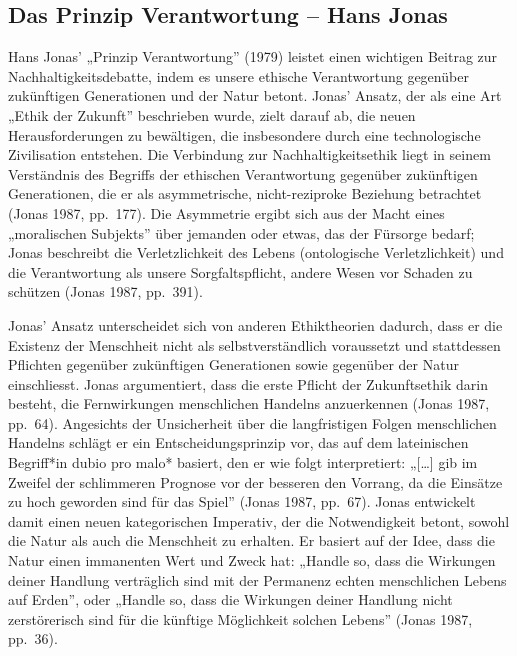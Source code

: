 \documentclass[
  nswissgerman,
  a4paper,
  openany]{book}
\begin{document}
\subsection{Das Prinzip Verantwortung -- Hans
Jonas}\label{das-prinzip-verantwortung-hans-jonas}

Hans Jonas' „Prinzip Verantwortung'' (1979) leistet einen wichtigen
Beitrag zur Nachhaltigkeitsdebatte, indem es unsere ethische
Verantwortung gegenüber zukünftigen Generationen und der Natur betont.
Jonas' Ansatz, der als eine Art „Ethik der Zukunft'' beschrieben wurde,
zielt darauf ab, die neuen Herausforderungen zu bewältigen, die
insbesondere durch eine technologische Zivilisation entstehen. Die
Verbindung zur Nachhaltigkeitsethik liegt in seinem Verständnis des
Begriffs der ethischen Verantwortung gegenüber zukünftigen Generationen,
die er als asymmetrische, nicht-reziproke Beziehung betrachtet (Jonas
1987, pp.~177). Die Asymmetrie ergibt sich aus der Macht eines
„moralischen Subjekts'' über jemanden oder etwas, das der Fürsorge
bedarf; Jonas beschreibt die Verletzlichkeit des Lebens (ontologische
Verletzlichkeit) und die Verantwortung als unsere Sorgfaltspflicht,
andere Wesen vor Schaden zu schützen (Jonas 1987, pp.~391).

Jonas' Ansatz unterscheidet sich von anderen Ethiktheorien dadurch, dass
er die Existenz der Menschheit nicht als selbstverständlich voraussetzt
und stattdessen Pflichten gegenüber zukünftigen Generationen sowie
gegenüber der Natur einschliesst. Jonas argumentiert, dass die erste
Pflicht der Zukunftsethik darin besteht, die Fernwirkungen menschlichen
Handelns anzuerkennen (Jonas 1987, pp.~64). Angesichts der Unsicherheit
über die langfristigen Folgen menschlichen Handelns schlägt er ein
Entscheidungsprinzip vor, das auf dem lateinischen Begriff*in dubio pro
malo* basiert, den er wie folgt interpretiert: „{[}\ldots{]} gib im
Zweifel der schlimmeren Prognose vor der besseren den Vorrang, da die
Einsätze zu hoch geworden sind für das Spiel'' (Jonas 1987, pp.~67).
Jonas entwickelt damit einen neuen kategorischen Imperativ, der die
Notwendigkeit betont, sowohl die Natur als auch die Menschheit zu
erhalten. Er basiert auf der Idee, dass die Natur einen immanenten Wert
und Zweck hat: „Handle so, dass die Wirkungen deiner Handlung
verträglich sind mit der Permanenz echten menschlichen Lebens auf
Erden'', oder „Handle so, dass die Wirkungen deiner Handlung nicht
zerstörerisch sind für die künftige Möglichkeit solchen Lebens'' (Jonas
1987, pp.~36).
\end{document}
